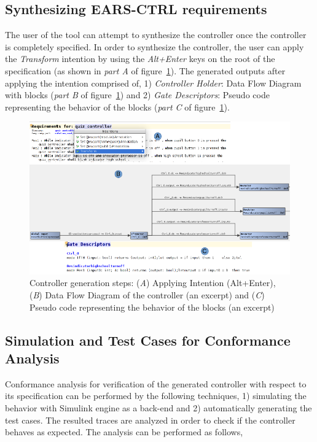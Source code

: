 \subsection{Synthesizing \textsf{EARS-CTRL} requirements}
\vspace{-.2cm}
The user of the tool can attempt to synthesize the controller
once the controller is completely specified. In order to synthesize the
controller, the user can apply the \emph{Transform} intention by using the
\emph{Alt+Enter} keys on the root of the specification (as shown in \emph{part
A} of figure~\ref{fig:Spec_transform}). The generated outputs after applying the
intention comprised of, 1) \emph{Controller Holder}: Data Flow
Diagram with blocks (\emph{part B} of figure~\ref{fig:Spec_transform}) and 2)
\emph{Gate Descriptors}:
Pseudo code representing the behavior of the blocks (\emph{part C} of
figure~\ref{fig:Spec_transform}).
\begin{figure}[!h]
\centering
\includegraphics[width=1\textwidth]{./images/Transform.png}
\caption{Controller generation steps: (\emph{A}) Applying Intention (Alt+Enter),
(\emph{B}) Data Flow Diagram of the controller (an excerpt) and (\emph{C})
Pseudo code representing the behavior of the blocks (an excerpt)}
\label{fig:Spec_transform}
\end{figure}
\vspace{-.5cm}
\subsection{Simulation and Test Cases for Conformance Analysis}
\vspace{-.2cm}
Conformance analysis for verification of the generated controller with respect
to its specification can be performed by the following techniques, 1) simulating
the behavior with Simulink engine \cite{MatlabSimulink} as a back-end and 2)
automatically generating the test cases.
The resulted traces are analyzed in order to check if the controller behaves as expected. The
analysis can be performed as follows,
